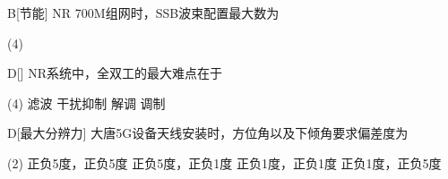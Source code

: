 

\begin{choice}{B}[节能]
    NR 700M组网时，SSB波束配置最大数为
    \begin{tasks}(4)
    \end{tasks}
\end{choice}

\begin{choice}{D}[]
    NR系统中，全双工的最大难点在于
    \begin{tasks}(4)
        \task 滤波
        \task 干扰抑制
        \task 解调
        \task 调制
    \end{tasks}
\end{choice}




\begin{choice}{D}[最大分辨力]
    大唐5G设备天线安装时，方位角以及下倾角要求偏差度为
    \begin{tasks}(2)
        \task 正负5度，正负5度
        \task 正负5度，正负1度
        \task 正负1度，正负1度
        \task 正负1度，正负5度
    \end{tasks}
\end{choice}


